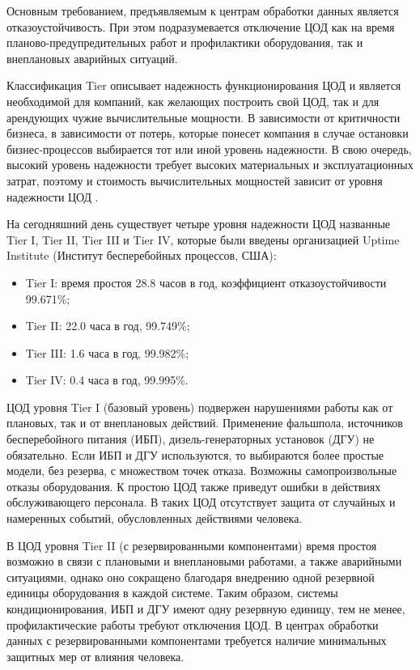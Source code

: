 Основным требованием, предъявляемым к центрам обработки данных является отказоустойчивость.
При этом подразумевается отключение ЦОД как на время планово-предупредительных работ и профилактики оборудования, так и внеплановых аварийных ситуаций.

Классификация Tier описывает надежность функционирования ЦОД и является необходимой для компаний, как желающих построить свой ЦОД, так и для арендующих чужие вычислительные мощности.
В зависимости от критичности бизнеса, в зависимости от потерь, которые понесет компания в случае остановки бизнес-процессов выбирается тот или иной уровень надежности.
В свою очередь, высокий уровень надежности требует высоких материальных и эксплуатационных затрат, поэтому и стоимость вычислительных мощностей зависит от уровня надежности ЦОД \cite{dc-tier}.

На сегодняшний день существует четыре уровня надежности ЦОД названные Tier I, Tier II, Tier III и Tier IV, которые были введены организацией Uptime Institute (Институт бесперебойных процессов, США):
\begin{itemize}
  \item Tier I: время простоя 28.8 часов в год, коэффициент отказоустойчивости 99.671\%;
  \item Tier II: 22.0 часа в год, 99.749\%;
  \item Tier III: 1.6 часа в год, 99.982\%;
  \item Tier IV: 0.4 часа в год, 99.995\%.
\end{itemize}

ЦОД уровня Tier I (базовый уровень) подвержен нарушениями работы как от плановых, так и от внеплановых действий.
Применение фальшпола, источников бесперебойного питания (ИБП), дизель-генераторных установок (ДГУ) не обязательно.
Если ИБП и ДГУ используются, то выбираются более простые модели, без резерва, с множеством точек отказа.
Возможны самопроизвольные отказы оборудования.
К простою ЦОД также приведут ошибки в действиях обслуживающего персонала.
В таких ЦОД отсутствует защита от случайных и намеренных событий, обусловленных действиями человека.

В ЦОД уровня Tier II (с резервированными компонентами) время простоя возможно в связи с плановыми и внеплановыми работами, а также аварийными ситуациями, однако оно сокращено благодаря внедрению одной резервной единицы оборудования в каждой системе.
Таким образом, системы кондиционирования, ИБП и ДГУ имеют одну резервную единицу, тем не менее, профилактические работы требуют отключения ЦОД.
В центрах обработки данных с резервированными компонентами требуется наличие минимальных защитных мер от влияния человека.


